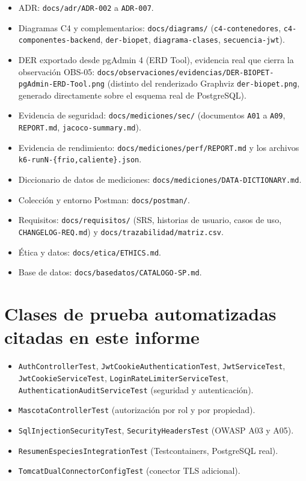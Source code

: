 \begin{itemize}[nosep]
  \item ADR: \texttt{docs/adr/ADR-002} a \texttt{ADR-007}.
  \item Diagramas C4 y complementarios: \texttt{docs/diagrams/}
    (\texttt{c4-contenedores}, \texttt{c4-componentes-backend},
    \texttt{der-biopet}, \texttt{diagrama-clases}, \texttt{secuencia-jwt}).
  \item DER exportado desde pgAdmin 4 (ERD Tool), evidencia real que cierra
    la observaci\'on OBS-05:
    \texttt{docs/observaciones/evidencias/DER-BIOPET-pgAdmin-ERD-Tool.png}
    (distinto del renderizado Graphviz \texttt{der-biopet.png}, generado
    directamente sobre el esquema real de PostgreSQL).
  \item Evidencia de seguridad: \texttt{docs/mediciones/sec/} (documentos
    \texttt{A01} a \texttt{A09}, \texttt{REPORT.md}, \texttt{jacoco-summary.md}).
  \item Evidencia de rendimiento: \texttt{docs/mediciones/perf/REPORT.md}
    y los archivos \texttt{k6-runN-\{frio,caliente\}.json}.
  \item Diccionario de datos de mediciones:
    \texttt{docs/mediciones/DATA-DICTIONARY.md}.
  \item Colecci\'on y entorno Postman: \texttt{docs/postman/}.
  \item Requisitos: \texttt{docs/requisitos/} (SRS, historias de usuario,
    casos de uso, \texttt{CHANGELOG-REQ.md}) y
    \texttt{docs/trazabilidad/matriz.csv}.
  \item \'Etica y datos: \texttt{docs/etica/ETHICS.md}.
  \item Base de datos: \texttt{docs/basedatos/CATALOGO-SP.md}.
\end{itemize}

\section{Clases de prueba automatizadas citadas en este informe}

\begin{itemize}[nosep]
  \item \texttt{AuthControllerTest}, \texttt{JwtCookieAuthenticationTest},
    \texttt{JwtServiceTest}, \texttt{JwtCookieServiceTest},
    \texttt{LoginRateLimiterServiceTest},
    \texttt{AuthenticationAuditServiceTest} (seguridad y autenticaci\'on).
  \item \texttt{MascotaControllerTest} (autorizaci\'on por rol y por
    propiedad).
  \item \texttt{SqlInjectionSecurityTest}, \texttt{SecurityHeadersTest}
    (OWASP A03 y A05).
  \item \texttt{ResumenEspeciesIntegrationTest} (Testcontainers,
    PostgreSQL real).
  \item \texttt{TomcatDualConnectorConfigTest} (conector TLS adicional).
\end{itemize}


